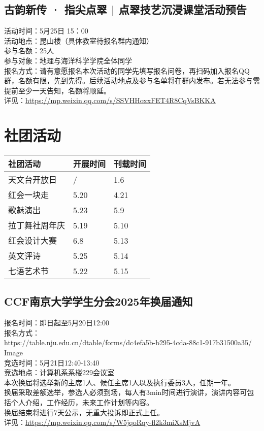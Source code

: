 \documentclass[letterpaper, 12pt]{article}
\begin{document}
\begin{multicols}{2}
\subsection{古韵新传 · 指尖点翠 | 点翠技艺沉浸课堂活动预告} %
活动时间：5月25日 15：00
\\活动地点：昆山楼（具体教室待报名群内通知）
\\参与名额：25人
\\参与对象：地理与海洋科学学院全体同学
\\报名方式：请有意愿报名本次活动的同学先填写报名问卷，再扫码加入报名QQ群，名额有限，先到先得。后续活动地点及参与名单将在群内发布。若无法参与需提前至少一天告知，名额将顺延。
\\详见：\url{https://mp.weixin.qq.com/s/SSVHHoxxFET4R8CqVsBKKA}


\section{社团活动}
\begin{tabular}{|>{\centering\arraybackslash}m{}|m{}|m{}|}
    \hline
    社团活动 & 开展时间 & 刊载时间\\
    \hline\hline
    天文台开放日 & / & 1.6\\
    红会一块走 & 5.20 & 4.21\\
    歌魅演出 & 5.23 & 5.9\\
    拉丁舞社周年庆 & 5.19 & 5.10\\
    红会设计大赛 & 6.8 & 5.13\\
    英文评诗 & 5.25 & 5.14\\
    七语艺术节 & 5.22 & 5.15\\
    \hline
\end{tabular}
\subsection{CCF南京大学学生分会2025年换届通知} %
报名时间：即日起至5月20日12:00
\\报名方式：
\\https://table.nju.edu.cn/dtable/forms/dc4efa5b-b295-4cda-88c1-917b31500a35/
\\Image
\\竞选时间：5月21日12:40-13:40
\\竞选地点：计算机系系楼229会议室
\\本次换届将选举新的主席1人、候任主席1人以及执行委员3人，任期一年。
\\换届采取差额选举，参选人必须到场，每人有3min时间进行演讲，演讲内容可包括个人介绍，工作经历，未来工作计划等内容。
\\换届结束将进行7天公示，无重大投诉即正式上任。
\\详见：\url{https://mp.weixin.qq.com/s/W5jqoRqy-fl2k3miXsMjvA}
\end{multicols}
\end{document}
